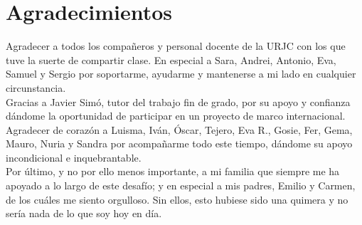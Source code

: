 \chapter*{Agradecimientos}
\thispagestyle{empty}
\label{cap:agradecimientos}
Agradecer a todos los compañeros y personal docente de la URJC con los que tuve la suerte de compartir clase. En especial a Sara, Andrei, Antonio, Eva, Samuel y Sergio por soportarme, ayudarme y mantenerse a mi lado en cualquier circunstancia.\\

Gracias a Javier Simó, tutor del trabajo fin de grado, por su apoyo y confianza dándome la oportunidad de participar en un proyecto de marco internacional.\\ 


Agradecer de corazón a Luisma, Iván, Óscar, Tejero, Eva R., Gosie, Fer, Gema, Mauro, Nuria y Sandra por acompañarme todo este tiempo, dándome su apoyo incondicional e inquebrantable.\\

Por último, y no por ello menos importante, a mi familia que siempre me ha apoyado a lo largo de este desafío; y en especial a mis padres, Emilio y Carmen, de los cuáles me siento orgulloso. Sin ellos, esto hubiese sido una quimera y no sería nada de lo que soy hoy en día.

\afterpage{\null\newpage}
\pagestyle{empty}